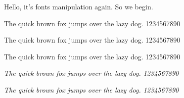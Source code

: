 \documentclass{article}
\newcommand{\pangram}[1][\rmfamily]{{#1 The quick brown fox jumps
over the lazy dog. 1234567890}\par}
\begin{document}
    Hello, it's fonts manipulation again. So we begin.

    \pangram
    \pangram[\sffamily]
    \pangram[\ttfamily]
    \pangram[\itshape]
    \pangram[\slshape]
\end{document}
